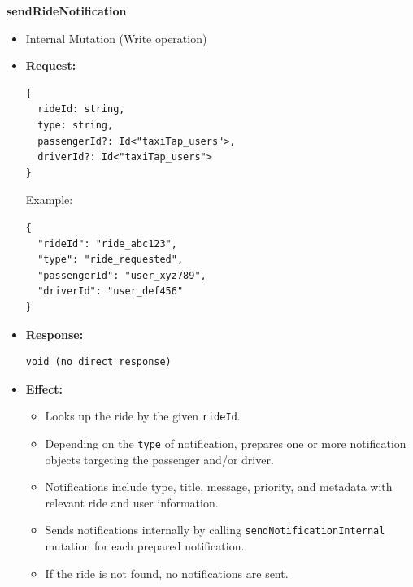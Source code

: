 \documentclass[a4paper,12pt]{article}
\begin{document}
\item \textbf{sendRideNotification}
  \begin{itemize}
    \item Internal Mutation (Write operation)
    \item \textbf{Request:}
    \begin{verbatim}
{
  rideId: string,
  type: string,
  passengerId?: Id<"taxiTap_users">,
  driverId?: Id<"taxiTap_users">
}
    \end{verbatim}
    Example:
    \begin{verbatim}
{
  "rideId": "ride_abc123",
  "type": "ride_requested",
  "passengerId": "user_xyz789",
  "driverId": "user_def456"
}
    \end{verbatim}
    \item \textbf{Response:}
    \begin{verbatim}
void (no direct response)
    \end{verbatim}
    \item \textbf{Effect:}
    \begin{itemize}
      \item Looks up the ride by the given \texttt{rideId}.
      \item Depending on the \texttt{type} of notification, prepares one or more notification objects targeting the passenger and/or driver.
      \item Notifications include type, title, message, priority, and metadata with relevant ride and user information.
      \item Sends notifications internally by calling \texttt{sendNotificationInternal} mutation for each prepared notification.
      \item If the ride is not found, no notifications are sent.
    \end{itemize}
  \end{itemize}
\end{document}
